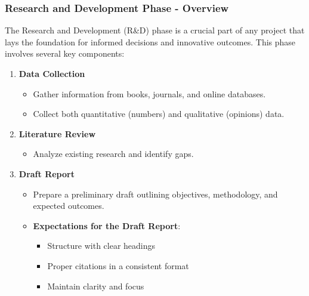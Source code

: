 \documentclass{beamer}
\begin{document}
\begin{frame}[fragile]
    \frametitle{Research and Development Phase - Overview}
    The Research and Development (R\&D) phase is a crucial part of any project that lays the foundation for informed decisions and innovative outcomes. This phase involves several key components:
    
    \begin{enumerate}
        \item \textbf{Data Collection} 
            \begin{itemize}
                \item Gather information from books, journals, and online databases.
                \item Collect both quantitative (numbers) and qualitative (opinions) data.
            \end{itemize}
            
        \item \textbf{Literature Review} 
            \begin{itemize}
                \item Analyze existing research and identify gaps.
            \end{itemize}
            
        \item \textbf{Draft Report} 
            \begin{itemize}
                \item Prepare a preliminary draft outlining objectives, methodology, and expected outcomes.
                \item \textbf{Expectations for the Draft Report}:
                    \begin{itemize}
                        \item Structure with clear headings
                        \item Proper citations in a consistent format
                        \item Maintain clarity and focus
                    \end{itemize}
            \end{itemize}
    \end{enumerate}
\end{frame}
\end{document}
